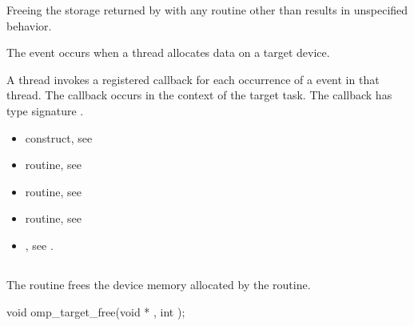 \begin{ccppspecific}
Freeing the storage returned by  with any routine
other than  results in unspecified behavior.

\events
The  event occurs when a thread allocates data on a target device.

\tools

A thread invokes a registered 
callback for each occurrence of a  event in that thread. 
The callback occurs in the context of the target task.  The callback has type signature
. 


\crossreferences
\begin{itemize}
\item {} construct, see 

\item {} routine, see 

\item {} routine, see 

\item {} routine, see 

\item {}, see 
.

\end{itemize}



\subsection{}
\label{subsec:omp_target_free}
\summary
The  routine frees the device memory allocated by the  routine.

\begin{figure}[t!]
\end{figure}

\format
\begin{boxedcode}
void omp\_target\_free(void * , int );
\end{boxedcode}


\end{ccppspecific}
